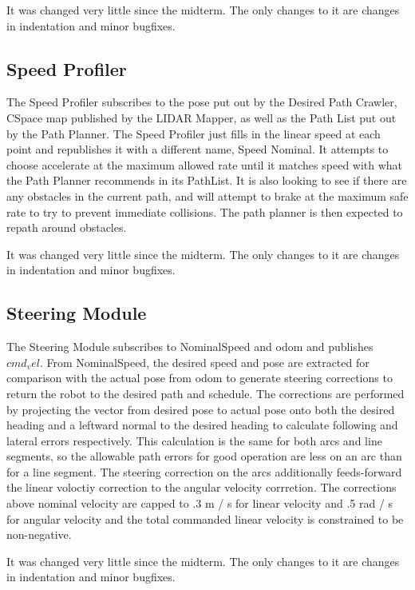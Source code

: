 \documentclass{article}
\begin{document}
It was changed very little since the midterm. The only changes to it are changes in indentation and minor bugfixes.


\subsection{Speed Profiler}

The Speed Profiler subscribes to the pose put out by the Desired Path Crawler, CSpace map published by the LIDAR Mapper, as well as the Path List put out by the Path Planner.
The Speed Profiler just fills in the linear speed at each point and republishes it with a different name, Speed Nominal.
It attempts to choose accelerate at the maximum allowed rate until it matches speed with what the Path Planner recommends in its PathList.
It is also looking to see if there are any obstacles in the current path, and will attempt to brake at the maximum safe rate to try to prevent immediate collisions.
The path planner is then expected to repath around obstacles.

It was changed very little since the midterm. The only changes to it are changes in indentation and minor bugfixes.

\subsection{Steering Module}

The Steering Module subscribes to NominalSpeed and odom and publishes $cmd_vel$.
From NominalSpeed, the desired speed and pose are extracted for comparison with the actual pose from odom to generate steering corrections to return the robot to the desired path and schedule.
The corrections are performed by projecting the vector from desired pose to actual pose onto both the desired heading and a leftward normal to the desired heading to calculate following and lateral errors respectively.
This calculation is the same for both arcs and line segments, so the allowable path errors for good operation are less on an arc than for a line segment.
The steering correction on the arcs additionally feeds-forward the linear voloctiy correction to the angular velocity corrretion.
The corrections above nominal velocity are capped to .3 m / s for linear velocity and .5 rad / s for angular velocity and the total commanded linear velocity is constrained to be non-negative.

It was changed very little since the midterm. The only changes to it are changes in indentation and minor bugfixes.
\end{document}
